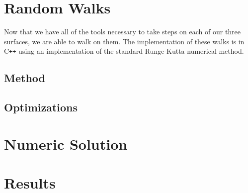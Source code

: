 \documentclass{article}
\begin{document}
\section{Random Walks}
	Now that we have all of the tools necessary to take steps on each of our three surfaces, we are able to walk on them.
	The implementation of these walks is in C\texttt{++} using an implementation of the standard Runge-Kutta numerical method.
	
	\subsection{Method}
	
	\subsection{Optimizations}

\section{Numeric Solution}

\section{Results}



\end{document}
